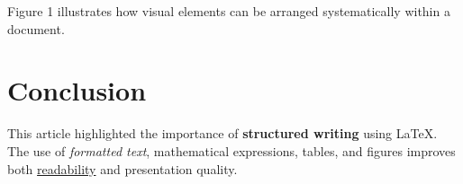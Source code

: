 \documentclass{article}
\begin{document}

\noindent Figure 1 illustrates how visual elements can be arranged systematically within a document.

\section{Conclusion}

This article highlighted the importance of \textbf{structured writing} using \LaTeX. The use of \textit{formatted text}, mathematical expressions, tables, and figures improves both \underline{readability} and presentation quality. 
\end{document}
